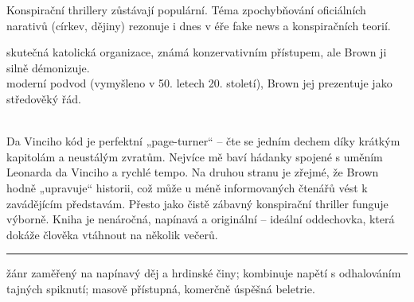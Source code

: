 \documentclass[FGBook.tex]{subfiles}
\begin{document}
\noindent Konspirační thrillery zůstávají populární. Téma zpochybňování oficiálních narativů (církev, dějiny) rezonuje i dnes v éře fake news a konspiračních teorií.

\noindent 
{} skutečná katolická organizace, známá konzervativním přístupem, ale Brown ji silně démonizuje.\\
 moderní podvod (vymyšleno v 50. letech 20. století), Brown jej prezentuje jako středověký řád.

\vspace*{2em}\\
\noindent Da Vinciho kód je perfektní „page-turner“ – čte se jedním dechem díky krátkým kapitolám a neustálým zvratům. Nejvíce mě baví hádanky spojené s uměním Leonarda da Vinciho a rychlé tempo. Na druhou stranu je zřejmé, že Brown hodně „upravuje“ historii, což může u méně informovaných čtenářů vést k zavádějícím představám. Přesto jako čistě zábavný konspirační thriller funguje výborně. Kniha je nenáročná, napínavá a originální – ideální oddechovka, která dokáže člověka vtáhnout na několik večerů.

\vfill

\noindent\begin{minipage}{\textwidth}
    {\textcolor{\wpagecolor}{\rule{\linewidth}{0.4pt}}
    \footnotesize
     žánr zaměřený na napínavý děj a hrdinské činy; 
     kombinuje napětí s odhalováním tajných spiknutí; 
     masově přístupná, komerčně úspěšná beletrie.
    }
\end{minipage}

\newpage
\end{document}
